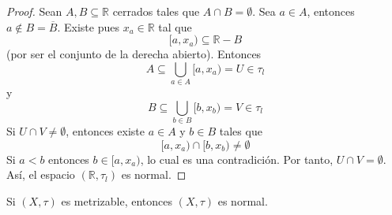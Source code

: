 \documentclass[12pt]{report}
\theoremstyle{largebreak}
\begin{document}
    \begin{proof}
        Sean $A,B\subseteq\mathbb{R}$ cerrados tales que $A\cap B=\emptyset$. Sea $a\in A$, entonces $a\notin B=\overline{B}$. Existe pues $x_a\in\mathbb{R}$ tal que
        \begin{equation*}
            [a,x_a)\subseteq \mathbb{R}-B
        \end{equation*}
        (por ser el conjunto de la derecha abierto). Entonces
        \begin{equation*}
            A\subseteq\bigcup_{ a\in A}[a,x_a)=U\in\tau_l
        \end{equation*}
        y
        \begin{equation*}
            B\subseteq\bigcup_{ b\in B}[b,x_b)=V\in\tau_l
        \end{equation*}
        Si $U\cap V\neq\emptyset$, entonces existe $a\in A$ y $b\in B$ tales que
        \begin{equation*}
            [a,x_a)\cap[b,x_b)\neq\emptyset
        \end{equation*}
        Si $a<b$ entonces $b\in [a,x_a)$, lo cual es una contradición. Por tanto, $U\cap V=\emptyset$. Así, el espacio $(\mathbb{R},\tau_l)$ es normal.
    \end{proof}

    \begin{propo}
        Si $(X,\tau)$ es metrizable, entonces $(X,\tau)$ es normal.
    \end{propo}
\end{document}
